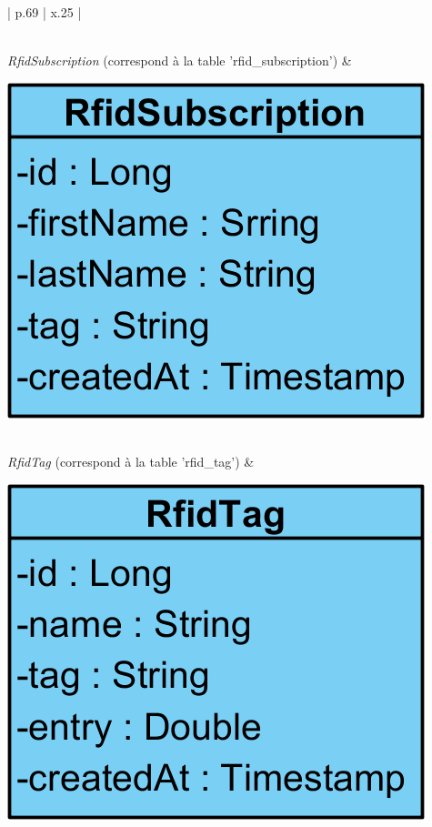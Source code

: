 \begin{center}
{\begin{longtable}{| p{.69\textwidth} | x{.25\textwidth} |}
\begin{minipage}{\linewidth}
        \vspace{12pt}
    \end{minipage}\\
    \hline
    \emph{RfidSubscription} (correspond à la table 'rfid\_subscription') &
    \begin{minipage}{\linewidth}
        \centering
        \vspace{12pt}
        \includegraphics[scale=0.8]{img/rfid-sub}\par
        \vspace{12pt}
    \end{minipage}\\
    \hline
    \emph{RfidTag} (correspond à la table 'rfid\_tag') &
    \begin{minipage}{\linewidth}
        \centering
        \vspace{12pt}
        \includegraphics[scale=0.8]{img/rfid-tag}\par

\end{minipage}
\end{longtable}}
\end{center}
